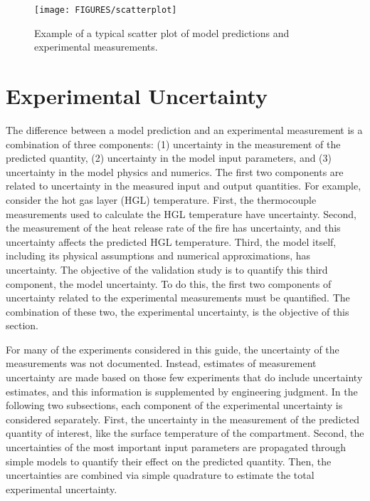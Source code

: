\begin{figure}[ht]
\begin{center}
\texttt{[image: FIGURES/scatterplot]}
\end{center}
\caption[Sample scatter plot]{Example of a typical scatter plot of model predictions and experimental measurements.}
\label{scatterplot}
\end{figure}


\section{Experimental Uncertainty}

The difference between a model prediction and an experimental measurement is a combination of three components: (1) uncertainty in the measurement of the predicted quantity, (2) uncertainty in the model input parameters, and (3) uncertainty in the model physics and numerics. The first two components are related to uncertainty in the measured input and output quantities. For example, consider the hot gas layer (HGL) temperature. First, the thermocouple measurements used to calculate the HGL temperature have uncertainty. Second, the measurement of the heat release rate of the fire has uncertainty, and this uncertainty affects the predicted HGL temperature. Third, the model itself, including its physical assumptions and numerical approximations, has uncertainty. The objective of the validation study is to quantify this third component, the model uncertainty. To do this, the first two components of uncertainty related to the experimental measurements must be quantified. The combination of these two, the experimental uncertainty, is the objective of this section.

For many of the experiments considered in this guide, the uncertainty of the measurements was not documented. Instead, estimates of measurement uncertainty are made based on those few experiments that do include uncertainty estimates, and this information is supplemented by engineering judgment. In the following two subsections, each component of the experimental uncertainty is considered separately. First, the uncertainty in the measurement of the predicted quantity of interest, like the surface temperature of the compartment. Second, the uncertainties of the most important input parameters are propagated through simple models to quantify their effect on the predicted quantity. Then, the uncertainties are combined via simple quadrature to estimate the total experimental uncertainty.

